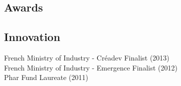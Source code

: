 \documentclass[10pt]{article}
\newcommand{\subsectionsep}{\vspace{0.5pt}}
\begin{document}
\begin{paracol}{2}

\section{Awards}

\subsection{Innovation}
\subsectionsep
French Ministry of Industry - Créadev Finalist (2013) \\
French Ministry of Industry - Emergence Finalist (2012) \\
Phar Fund Laureate (2011) \\

\end{paracol}
\end{document}
